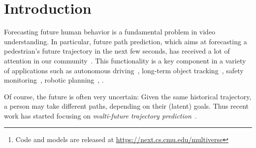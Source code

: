 \documentclass[10pt,twocolumn,letterpaper]{article}
\newcommand{\fancyname}{Multiverse}\newcommand{\Tpred}{T_{\text{pred}}}
\begin{document}
\setlength{\abovedisplayskip}{2pt} \setlength{\belowdisplayskip}{3pt}

\vspace{-2mm}
\begin{abstract}
\vspace{-2mm}
This paper studies the problem of predicting the distribution over multiple possible future paths of people as they move through various visual scenes.
We make two main contributions.
The first contribution is a new dataset, created in a realistic 3D simulator,
which is based on real world trajectory data, and then
extrapolated by human annotators to achieve different latent goals.
This provides the first benchmark for quantitative evaluation
of the models to predict multi-future trajectories.
The second contribution is a new model to generate multiple plausible future trajectories,
which contains novel designs of using multi-scale location encodings and convolutional RNNs over graphs.
We refer to our model as \textit{\fancyname}. 
We show that our model achieves the best results
on our dataset, as well as on the real-world VIRAT/ActEV dataset
(which just contains one possible future).
~\footnote{Code and models are released at \url{https://next.cs.cmu.edu/multiverse}}
\end{abstract} \vspace{-7mm}

\vspace{-1mm}
\section{Introduction}
\vspace{-1mm}
Forecasting future
human behavior is a fundamental problem in video understanding. In particular, future path prediction, which aims at forecasting a pedestrian's future trajectory in the next few seconds, has received 
a lot of attention in our community~\cite{kitani2012activity,alahi2016social,gupta2018social,li2019way}. This functionality 
is a key component in a variety of applications such as autonomous driving~\cite{bansal2018chauffeurnet,chai2019multipath}, long-term object tracking~\cite{kalman1960new, sadeghian2017tracking}, safety monitoring~\cite{liang2019peeking}, robotic planning~\cite{rhinehart2017first,rhinehart2018r2p2},
\etc.

Of course, the future is often very uncertain:
Given the same historical trajectory, a person
may take different paths, depending on their 
(latent) goals. Thus recent work has started focusing on  \emph{multi-future trajectory prediction}~\cite{tang2019multiple,chai2019multipath,li2019way,makansi2019overcoming, thiede2019analyzing,lee2017desire}.
\end{document}
